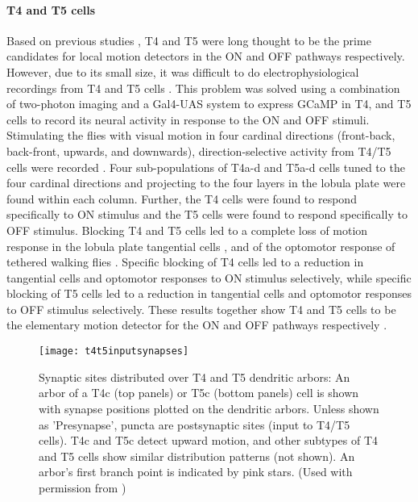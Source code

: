 \paragraph{T4 and T5 cells}
Based on previous studies \parencite{Fischbach1989, Buchner1984}, T4 and T5 were long thought to be the prime candidates for local motion detectors in the ON and OFF pathways respectively. However, due to its small size, it was difficult to do electrophysiological recordings from T4 and T5 cells \parencite{Douglass1996}. This problem was solved using a combination of two-photon imaging and a Gal4-UAS system to express GCaMP in T4, and T5 cells to record its neural activity in response to the ON and OFF stimuli. Stimulating the flies with visual motion in four cardinal directions (front-back, back-front, upwards, and downwards), direction-selective activity from T4/T5 cells were recorded \parencite{Maisak2013}. Four sub-populations of T4a-d and T5a-d cells tuned to the four cardinal directions and projecting to the four layers in the lobula plate were found within each column. Further, the T4 cells were found to respond specifically to ON stimulus and the T5 cells were found to respond specifically to OFF stimulus. Blocking T4 and T5 cells led to a complete loss of motion response in the lobula plate tangential cells \parencite{Schnell2012}, and of the optomotor response of tethered walking flies \parencite{Bahl2013}. Specific blocking of T4 cells led to a reduction in tangential cells and optomotor responses to ON stimulus selectively, while specific blocking of T5 cells led to a reduction in tangential cells and optomotor responses to OFF stimulus selectively. These results together show T4 and T5 cells to be the elementary motion detector for the ON and OFF pathways respectively \parencite{Maisak2013}.    

\begin{figure}
\centering
\hspace*{-1.4cm} 
\texttt{[image: t4t5inputsynapses]}
\caption[Synaptic sites distributed over T4 and T5 dendritic arbors]{Synaptic sites distributed over T4 and T5 dendritic arbors: An arbor of a T4c (top panels) or T5c (bottom panels) cell is shown with synapse positions plotted on the dendritic arbors. Unless shown as 'Presynapse', puncta are postsynaptic sites (input to T4/T5 cells). T4c and T5c detect upward motion, and other subtypes of T4 and T5 cells show similar distribution patterns (not shown). An arbor's first branch point is indicated by pink stars. (Used with permission from \cite{Shinomiya2019})}
\label{fig:t4t5inputsynapses}
\end{figure}  

